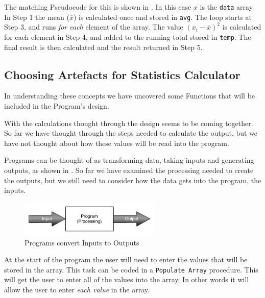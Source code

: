 The matching Pseudocode for this is shown in . In this case $x$ is the \texttt{data} array. In Step 1 the mean ($\overline{x}$) is calculated once and stored in \texttt{avg}. The loop starts at Step 3, and runs \emph{for each} element of the array. The value $(x_{i} - \overline{x})^2$ is calculated for each element in Step 4, and added to the running total stored in \texttt{temp}. The final result is then calculated and the result returned in Step 5.




\subsection{Choosing Artefacts for Statistics Calculator} %
\label{sub:choosing_artefacts_for_statistics_calculator}

In understanding these concepts we have uncovered some Functions that will be included in the Program's design. 

With the calculations thought through the design seems to be coming together. So far we have thought through the steps needed to calculate the output, but we have not thought about how these values will be read into the program.

Programs can be thought of as transforming data, taking inputs and generating outputs, as shown in . So far we have examined the processing needed to create the outputs, but we still need to consider how the data gets into the program, the inputs.

\begin{figure}[h]
   \centering
   \includegraphics[width=0.6\textwidth]{./topics/arrays/diagrams/ProcessingOverview} 
   \caption{Programs convert Inputs to Outputs}
   \label{fig:input-output-overview}
\end{figure}

At the start of the program the user will need to enter the values that will be stored in the array. This task can be coded in a \texttt{Populate Array} procedure. This will get the user to enter all of the values into the array. In other words it will allow the user to enter \emph{each value} in the array.

